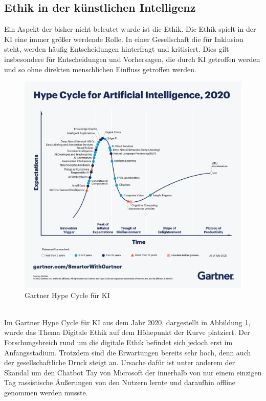 \begin{onehalfspace}
    \subsection{Ethik in der künstlichen Intelligenz}
    \label{subsubsec:ethikinderKI}
        Ein Aspekt der bisher nicht beleutet wurde ist die Ethik. Die Ethik spielt in der \ac{KI} eine immer größer werdende Rolle. In einer Gesellschaft die für Inklusion steht, werden häufig Entscheidungen hinterfragt und kritisiert. Dies gilt insbesondere für Entscheidungen und Vorhersagen, die durch \ac{KI} getroffen werden und so ohne direkten menschlichen Einfluss getroffen werden.
        \begin{figure}[h]
            \centering
            \includegraphics[width = 14cm]{Bilder/Gartner_hypeCycle.png}
            \caption{Gartner Hype Cycle für \ac*{KI} \cite{Goasduff2020}}
            \label{fig:HypeCycle}
        \end{figure}
        \\
        Im Gartner Hype Cycle für \ac*{KI} aus dem Jahr 2020, dargestellt in Abbildung \ref*{fig:HypeCycle}, wurde das Thema Digitale Ethik auf dem Höhepunkt der Kurve platziert. Der Forschungsbreich rund um die digitale Ethik befindet sich jedoch erst im Anfangsstadium. Trotzdem sind die Erwartungen bereits sehr hoch, denn auch der gesellschaftliche Druck steigt an. Ursache dafür ist unter anderem der Skandal um den Chatbot Tay von Microsoft der innerhalb von nur einem einzigen Tag rassistische \"Außerungen von den Nutzern lernte und daraufhin offline genommen werden musste.\cite{Cremers2019}

\end{onehalfspace}
